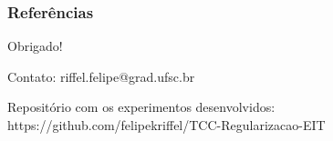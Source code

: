 \documentclass{beamer}
\begin{document}
\begin{frame}
\frametitle{Referências}
\vspace{-2em}
\scriptsize

    
\end{frame}

\begin{frame}

\begin{center}
\Large Obrigado!
\end{center}

\vspace{1em}
Contato: riffel.felipe@grad.ufsc.br 

Repositório com os experimentos desenvolvidos: https://github.com/felipekriffel/TCC-Regularizacao-EIT
    
\end{frame}
\end{document}
